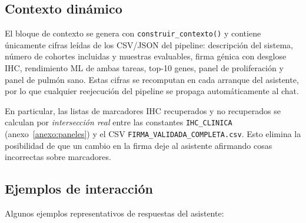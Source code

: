 \subsection*{Contexto dinámico}
{}

El bloque de contexto se genera con \texttt{construir\_contexto()} y
contiene únicamente cifras leídas de los CSV/JSON del pipeline:
descripción del sistema, número de cohortes incluidas y muestras
evaluables, firma génica con desglose IHC, rendimiento ML de ambas
tareas, top-10 genes, panel de proliferación y panel de pulmón sano.
Estas cifras se recomputan en cada arranque del asistente, por lo que
cualquier reejecución del pipeline se propaga automáticamente al chat.

En particular, las listas de marcadores IHC recuperados y no recuperados
se calculan por \emph{intersección real} entre las constantes
\texttt{IHC\_CLINICA} (anexo~\ref{anexo:paneles}) y el CSV
\texttt{FIRMA\_VALIDADA\_COMPLETA.csv}. Esto elimina la posibilidad de
que un cambio en la firma deje al asistente afirmando cosas incorrectas
sobre marcadores.

\subsection*{Ejemplos de interacción}
{}

Algunos ejemplos representativos de respuestas del asistente:

